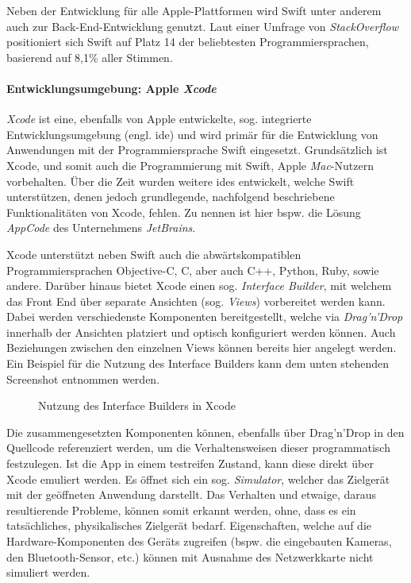 Neben der Entwicklung für alle Apple-Plattformen wird Swift unter anderem auch zur Back-End-Entwicklung genutzt. Laut einer Umfrage von \textit{StackOverflow} positioniert sich Swift auf Platz 14 der beliebtesten Programmiersprachen, basierend auf 8,1\% aller Stimmen.

\paragraph{Entwicklungsumgebung: Apple \textit{Xcode}}
\textit{Xcode} ist eine, ebenfalls von Apple entwickelte, sog. integrierte Entwicklungsumgebung (engl. \ac{ide}) und wird primär für die Entwicklung von Anwendungen mit der Programmiersprache Swift eingesetzt. Grundsätzlich ist Xcode, und somit auch die Programmierung mit Swift, Apple \textit{Mac}-Nutzern vorbehalten. Über die Zeit wurden weitere \acp{ide} entwickelt, welche Swift unterstützen, denen jedoch grundlegende, nachfolgend beschriebene Funktionalitäten von Xcode, fehlen. Zu nennen ist hier bspw. die Lösung \textit{AppCode} des Unternehmens \textit{JetBrains}.

Xcode unterstützt neben Swift auch die abwärtskompatiblen Programmiersprachen Objective-C, C, aber auch C++, Python, Ruby, sowie andere. Darüber hinaus bietet Xcode einen sog. \textit{Interface Builder}, mit welchem das Front End über separate Ansichten (sog. \textit{Views}) vorbereitet werden kann. Dabei werden verschiedenste Komponenten bereitgestellt, welche via \textit{Drag'n'Drop} innerhalb der Ansichten platziert und optisch konfiguriert werden können. Auch Beziehungen zwischen den einzelnen Views können bereits hier angelegt werden. Ein Beispiel für die Nutzung des Interface Builders kann dem unten stehenden Screenshot entnommen werden.

\begin{figure}[h!]
	\centering
	\caption{Nutzung des Interface Builders in Xcode}
\end{figure}

Die zusammengesetzten Komponenten können, ebenfalls über Drag'n'Drop in den Quellcode referenziert werden, um die Verhaltensweisen dieser programmatisch festzulegen. Ist die App in einem testreifen Zustand, kann diese direkt über Xcode emuliert werden. Es öffnet sich ein sog. \textit{Simulator}, welcher das Zielgerät mit der geöffneten Anwendung darstellt. Das Verhalten und etwaige, daraus resultierende Probleme, können somit erkannt werden, ohne, dass es ein tatsächliches, physikalisches Zielgerät bedarf. Eigenschaften, welche auf die Hardware-Komponenten des Geräts zugreifen (bspw. die eingebauten Kameras, den Bluetooth-Sensor, etc.) können mit Ausnahme des Netzwerkkarte nicht simuliert werden.

